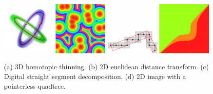 \documentclass{article}
\begin{document}
\begin{figure}
  \begin{center}
    \includegraphics[width=0.24\textwidth]{./thinning-3D}
    \includegraphics[width=0.24\textwidth]{./edt-2D}
    \includegraphics[width=0.24\textwidth]{./dss}
    \includegraphics[width=0.24\textwidth]{./hashtree}
  \end{center}
  
  \caption{(a) 3D homotopic thinning. (b) 2D euclidean distance transform. (c) Digital straight segment decomposition. (d) 2D image with a pointerless quadtree.}
\end{figure}
\end{document}
